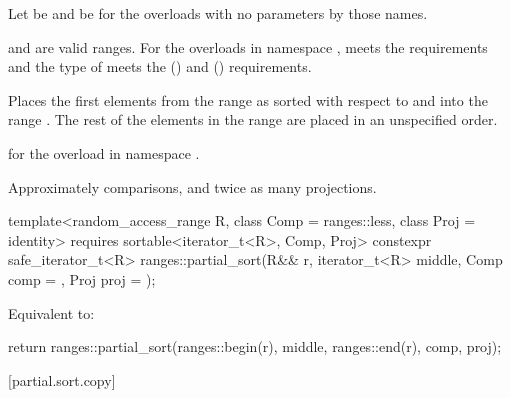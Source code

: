 \begin{itemdescr}
\pnum
Let  be 
and  be 
for the overloads with no parameters by those names.

\pnum
\expects
{} and  are valid ranges.
For the overloads in namespace ,
 meets
the  requirements and
the type of  meets
the  () and
 () requirements.

\pnum
\effects
Places the first  elements
from the range 
as sorted with respect to  and 
into the range .
The rest of the elements in the range 
are placed in an unspecified order.
%

\pnum
\returns
{} for the overload in namespace .

\pnum
\complexity
Approximately  comparisons, and
twice as many projections.
\end{itemdescr}

\begin{itemdecl}
template<random_access_range R, class Comp = ranges::less, class Proj = identity>
  requires sortable<iterator_t<R>, Comp, Proj>
  constexpr safe_iterator_t<R>
    ranges::partial_sort(R&& r, iterator_t<R> middle, Comp comp = {}, Proj proj = {});
\end{itemdecl}

\begin{itemdescr}
\pnum
\effects
Equivalent to:
\begin{codeblock}
return ranges::partial_sort(ranges::begin(r), middle, ranges::end(r), comp, proj);
\end{codeblock}
\end{itemdescr}

[partial.sort.copy]{}

